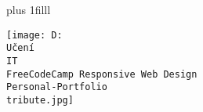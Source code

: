 \documentclass{photobook} %
\begin{document}
\maketitle
\pagestyle{empty}
\begin{minipage}{\imgwidth}%
\drawtrimcorners%
\vskip0pt plus 1filll
\begin{minipage}{\imgwidth}%
 \hfil\texttt{[image: D:\\Učení\\IT\\FreeCodeCamp Responsive Web Design\\Personal-Portfolio\\tribute.jpg]}\hfil
\end{minipage}
\end{minipage}
\newpage
\end{document}
